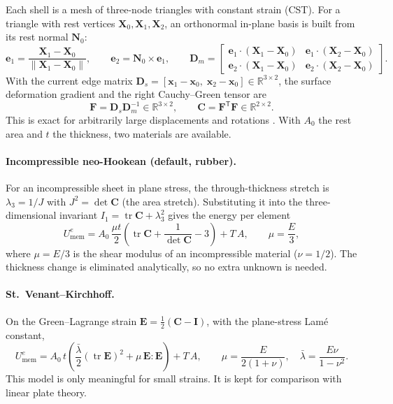 \documentclass[11pt,a4paper]{article}
\newcommand{\vect}[1]{\bm{#1}}
\newcommand{\x}{\vect{x}}
\newcommand{\X}{\vect{X}}
\newcommand{\I}{\mathbf{I}}
\DeclareMathOperator{\tr}{tr}
\theoremstyle{remark}
\begin{document}
Each shell is a mesh of three-node triangles with constant strain (CST). For a triangle with
rest vertices $\X_0,\X_1,\X_2$, an orthonormal in-plane basis is built from its rest normal
$\vect{N}_0$:
\begin{equation}
\vect{e}_1 = \frac{\X_1-\X_0}{\|\X_1-\X_0\|}, \qquad \vect{e}_2 = \vect{N}_0\times\vect{e}_1,
\qquad
\mathbf{D}_m = \begin{bmatrix} \vect{e}_1\cdot(\X_1-\X_0) & \vect{e}_1\cdot(\X_2-\X_0)\\
                               \vect{e}_2\cdot(\X_1-\X_0) & \vect{e}_2\cdot(\X_2-\X_0)\end{bmatrix}.
\end{equation}
With the current edge matrix $\mathbf{D}_s = [\x_1-\x_0,\; \x_2-\x_0] \in\mathbb{R}^{3\times2}$, the
surface deformation gradient and the right Cauchy--Green tensor are
\begin{equation}
\mathbf{F} = \mathbf{D}_s\mathbf{D}_m^{-1}\in\mathbb{R}^{3\times 2},\qquad
\mathbf{C} = \mathbf{F}^{\mathsf T}\mathbf{F}\in\mathbb{R}^{2\times2}.
\end{equation}
This is exact for arbitrarily large displacements and rotations \cite{bonet2008}. With $A_0$ the
rest area and $t$ the thickness, two materials are available.

\paragraph{Incompressible neo-Hookean (default, rubber).} For an incompressible sheet in plane
stress, the through-thickness stretch is $\lambda_3 = 1/J$ with $J^2 = \det\mathbf{C}$ (the area
stretch). Substituting it into the three-dimensional invariant
$I_1 = \tr\mathbf{C} + \lambda_3^2$ gives the energy per element
\begin{equation}\label{eq:neohookean}
U_{\text{mem}}^{e} = A_0\,\frac{\mu t}{2}\left(\tr\mathbf{C} + \frac{1}{\det\mathbf{C}} - 3\right)
+ T\,A,
\qquad \mu = \frac{E}{3},
\end{equation}
where $\mu=E/3$ is the shear modulus of an incompressible material ($\nu = 1/2$). The thickness
change is eliminated analytically, so no extra unknown is needed.

\paragraph{St.\ Venant--Kirchhoff.} On the Green--Lagrange strain
$\mathbf{E} = \tfrac12(\mathbf{C}-\I)$, with the plane-stress Lamé constant,
\begin{equation}
U_{\text{mem}}^{e} = A_0\,t\left(\frac{\bar\lambda}{2}(\tr\mathbf{E})^2 + \mu\,\mathbf{E}:\mathbf{E}\right)
+ T\,A,
\qquad \mu = \frac{E}{2(1+\nu)},\quad \bar\lambda = \frac{E\nu}{1-\nu^2}.
\end{equation}
This model is only meaningful for small strains. It is kept for comparison with linear plate
theory.
\end{document}
